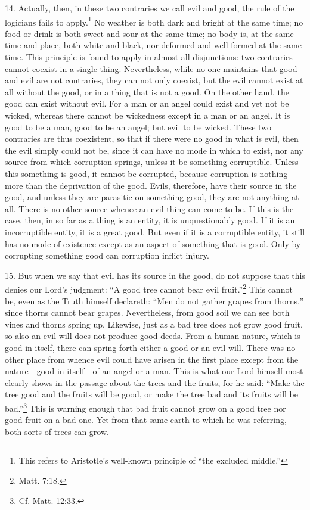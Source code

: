 14. Actually, then, in these two contraries we call evil and good, the rule of the logicians fails to apply.\footnote{This refers to Aristotle's well-known principle of ``the excluded middle.''} No weather is both dark and bright at the same time; no food or drink is both sweet and sour at the same time; no body is, at the same time and place, both white and black, nor deformed and well-formed at the same time. This principle is found to apply in almost all disjunctions: two contraries cannot coexist in a single thing. Nevertheless, while no one maintains that good and evil are not contraries, they can not only coexist, but the evil cannot exist at all without the good, or in a thing that is not a good. On the other hand, the good can exist without evil. For a man or an angel could exist and yet not be wicked, whereas there cannot be wickedness except in a man or an angel. It is good to be a man, good to be an angel; but evil to be wicked. These two contraries are thus coexistent, so that if there were no good in what is evil, then the evil simply could not be, since it can have no mode in which to exist, nor any source from which corruption springs, unless it be something corruptible. Unless this something is good, it cannot be corrupted, because corruption is nothing more than the deprivation of the good. Evils, therefore, have their source in the good, and unless they are parasitic on something good, they are not anything at all. There is no other source whence an evil thing can come to be. If this is the case, then, in so far as a thing is an entity, it is unquestionably good. If it is an incorruptible entity, it is a great good. But even if it is a corruptible entity, it still has no mode of existence except as an aspect of something that is good. Only by corrupting something good can corruption inflict injury.

15. But when we say that evil has its source in the good, do not suppose that this denies our Lord's judgment: ``A good tree cannot bear evil fruit.''\footnote{Matt. 7:18.} This cannot be, even as the Truth himself declareth: ``Men do not gather grapes from thorns,'' since thorns cannot bear grapes. Nevertheless, from good soil we can see both vines and thorns spring up. Likewise, just as a bad tree does not grow good fruit, so also an evil will does not produce good deeds. From a human nature, which is good in itself, there can spring forth either a good or an evil will. There was no other place from whence evil could have arisen in the first place except from the nature—good in itself—of an angel or a man. This is what our Lord himself most clearly shows in the passage about the trees and the fruits, for he said: ``Make the tree good and the fruits will be good, or make the tree bad and its fruits will be bad.''\footnote{Cf. Matt. 12:33.} This is warning enough that bad fruit cannot grow on a good tree nor good fruit on a bad one. Yet from that same earth to which he was referring, both sorts of trees can grow.

